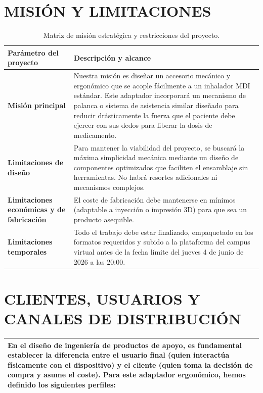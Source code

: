 \documentclass[11pt,a4paper]{article}
\begin{document}
\section{MISIÓN Y LIMITACIONES}


\renewcommand{\arraystretch}{1.6}
\begin{table}[H]
\centering\small
\begin{tabular}{|p{3.8cm}|p{10.2cm}|}
\hline
\rowcolor{ArthroNavy}
\textbf{\color{white}Parámetro del proyecto} & \textbf{\color{white}Descripción y alcance} \\
\hline
\textbf{Misión principal} & Nuestra misión es diseñar un accesorio mecánico y ergonómico que se acople fácilmente a un inhalador MDI estándar. Este adaptador incorporará un mecanismo de palanca o sistema de asistencia similar diseñado para reducir drásticamente la fuerza que el paciente debe ejercer con sus dedos para liberar la dosis de medicamento. \\
\hline
\textbf{Limitaciones de diseño} & Para mantener la viabilidad del proyecto, se buscará la máxima simplicidad mecánica mediante un diseño de componentes optimizados que faciliten el ensamblaje sin herramientas. No habrá resortes adicionales ni mecanismos complejos. \\
\hline
\textbf{Limitaciones económicas y de fabricación} & El coste de fabricación debe mantenerse en mínimos (adaptable a inyección o impresión 3D) para que sea un producto asequible. \\
\hline
\textbf{Limitaciones temporales} & Todo el trabajo debe estar finalizado, empaquetado en los formatos requeridos y subido a la plataforma del campus virtual antes de la fecha límite del jueves 4 de junio de 2026 a las 20:00. \\
\hline
\end{tabular}
\caption{Matriz de misión estratégica y restricciones del proyecto.}
\end{table}

\newpage
\section{CLIENTES, USUARIOS Y CANALES DE DISTRIBUCIÓN}


\renewcommand{\arraystretch}{1.6}
\begin{table}[H]
\centering\small
\begin{tabular}{|p{14.5cm}|}
\hline
\rowcolor{ArthroGray!15}
\textbf{\color{ArthroNavy}} En el diseño de ingeniería de productos de apoyo, es fundamental establecer la diferencia entre el usuario final (quien interactúa físicamente con el dispositivo) y el cliente (quien toma la decisión de compra y asume el coste). Para este adaptador ergonómico, hemos definido los siguientes perfiles: \\
\hline
\end{tabular}
\end{table}
\end{document}
